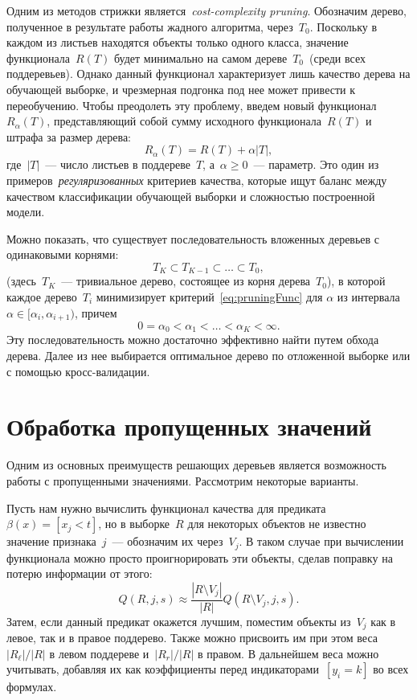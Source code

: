 \documentclass[12pt,fleqn]{article}
\begin{document}
Одним из методов стрижки является~\emph{cost-complexity pruning}.
Обозначим дерево, полученное в результате работы жадного алгоритма, через~$T_0$.
Поскольку в каждом из листьев находятся объекты только одного класса,
значение функционала~$R(T)$ будет минимально на самом дереве~$T_0$~(среди всех поддеревьев).
Однако данный функционал характеризует лишь качество дерева на обучающей выборке,
и чрезмерная подгонка под нее может привести к переобучению.
Чтобы преодолеть эту проблему, введем новый функционал~$R_\alpha(T)$,
представляющий собой сумму исходного функционала~$R(T)$ и штрафа за размер дерева:
\begin{equation}
\label{eq:pruningFunc}
    R_\alpha(T) = R(T) + \alpha |T|,
\end{equation}
где~$|T|$~--- число листьев в поддереве~$T$, а~$\alpha \geq 0$~--- параметр.
Это один из примеров~\emph{регуляризованных} критериев качества,
которые ищут баланс между качеством классификации обучающей выборки
и сложностью построенной модели.

Можно показать, что существует последовательность вложенных деревьев с одинаковыми корнями:
\[
    T_K \subset T_{K-1} \subset \dots \subset T_0,
\]
(здесь~$T_K$~--- тривиальное дерево, состоящее из корня дерева~$T_0$),
в которой каждое дерево~$T_i$ минимизирует критерий~\eqref{eq:pruningFunc}
для $\alpha$ из интервала $\alpha \in [\alpha_i, \alpha_{i+1})$,
причем
\[
    0 = \alpha_0 < \alpha_1 < \dots < \alpha_K < \infty.
\]
Эту последовательность можно достаточно эффективно найти путем обхода дерева.
Далее из нее выбирается оптимальное дерево по отложенной выборке или с помощью кросс-валидации.

\section{Обработка пропущенных значений}
Одним из основных преимуществ решающих деревьев является возможность работы
с пропущенными значениями.
Рассмотрим некоторые варианты.

Пусть нам нужно вычислить функционал качества для предиката~$\beta(x) = [x_j < t]$,
но в выборке~$R$ для некоторых объектов не известно значение признака~$j$~---
обозначим их через~$V_{j}$.
В таком случае при вычислении функционала можно просто проигнорировать эти объекты,
сделав поправку на потерю информации от этого:
\[
    Q(R, j, s)
    \approx
    \frac{|R \setminus V_{j}|}{|R|}
    Q(R \setminus V_{j}, j, s).
\]
Затем, если данный предикат окажется лучшим, поместим объекты из~$V_{j}$
как в левое, так и в правое поддерево.
Также можно присвоить им при этом веса~$|R_\ell| / |R|$ в левом поддереве и~$|R_r| / |R|$ в правом.
В дальнейшем веса можно учитывать, добавляя их как коэффициенты перед индикаторами~$[y_i = k]$
во всех формулах.
\end{document}
